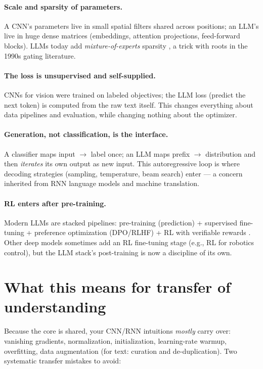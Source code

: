 \documentclass[11pt]{article}
\begin{document}
\paragraph{Scale and sparsity of parameters.} A CNN's parameters live in small spatial filters shared across positions; an LLM's live in huge dense matrices (embeddings, attention projections, feed-forward blocks). LLMs today add \emph{mixture-of-experts} sparsity \cite{shazeer2017sparsely}, a trick with roots in the 1990s gating literature.

\paragraph{The loss is unsupervised and self-supplied.} CNNs for vision were trained on labeled objectives; the LLM loss (predict the next token) is computed from the raw text itself. This changes everything about data pipelines and evaluation, while changing nothing about the optimizer.

\paragraph{Generation, not classification, is the interface.} A classifier maps input $\to$ label once; an LLM maps prefix $\to$ distribution and then \emph{iterates} its own output as new input. This autoregressive loop is where decoding strategies (sampling, temperature, beam search) enter --- a concern inherited from RNN language models and machine translation.

\paragraph{RL enters after pre-training.} Modern LLMs are stacked pipelines: pre-training (prediction) + supervised fine-tuning + preference optimization (DPO/RLHF) + RL with verifiable rewards \cite{ouyang2022training,rafailov2023direct}. Other deep models sometimes add an RL fine-tuning stage (e.g., RL for robotics control), but the LLM stack's post-training is now a discipline of its own.

\section{What this means for transfer of understanding}
Because the core is shared, your CNN/RNN intuitions \emph{mostly} carry over: vanishing gradients, normalization, initialization, learning-rate warmup, overfitting, data augmentation (for text: curation and de-duplication). Two systematic transfer mistakes to avoid:
\end{document}
